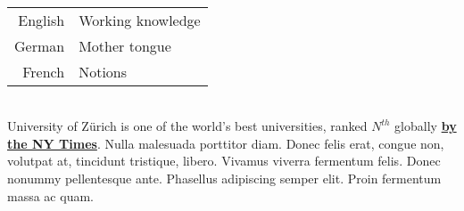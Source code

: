 \documentclass[theme]{cv_einstein}
\begin{document}
\begin{paracol}{2}
    
        \begin{leftcolumn*} \noindent \footnotesize
        {\color{white}
            \phantom{} \\ %
            \begin{minipage}[r]{\leftcolwidth}
                \begin{tabular}{r|l}
                    English & Working knowledge\\[0.3em]
                    German & Mother tongue\\[0.3em]
                    French & Notions
                \end{tabular}
            \end{minipage}
            \vspace{\sectionspace}
        }
        \end{leftcolumn*}
        \begin{rightcolumn}\noindent \small
            \phantom{} \\ %
            {University of Zürich is one of the world's best universities, ranked $N^{th}$ globally \href{http://example.com}{\textbf{by the NY Times}}.
            Nulla malesuada porttitor diam. Donec felis erat, congue non, volutpat at, tincidunt tristique, libero. Vivamus viverra fermentum felis. Donec nonummy pellentesque ante. Phasellus adipiscing semper elit. Proin fermentum massa ac quam.}

\end{rightcolumn}
\end{paracol}
\end{document}
